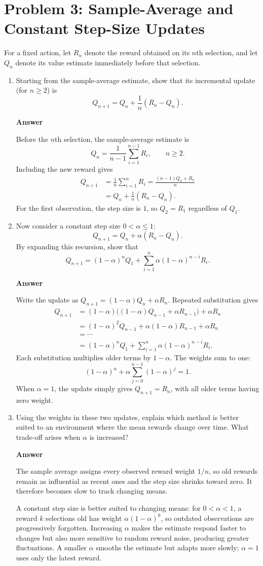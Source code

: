 \documentclass[11pt,a4paper]{article}
\newcommand{\answer}{\par\smallskip\textbf{Answer}\par}
\begin{document}
\newpage
\section{Problem 3: Sample-Average and Constant Step-Size Updates}
For a fixed action, let $R_n$ denote the reward obtained on its $n$th selection, and let $Q_n$ denote its value estimate immediately before that selection.
\begin{enumerate}
\item Starting from the sample-average estimate, show that its incremental update (for $n\geq2$) is
\[
Q_{n+1}=Q_n+\frac{1}{n}(R_n-Q_n).
\]
\answer
Before the $n$th selection, the sample-average estimate is
\[
Q_n=\frac{1}{n-1}\sum_{i=1}^{n-1}R_i,\qquad n\geq2.
\]
Including the new reward gives
\begin{align*}
Q_{n+1}
&=\frac{1}{n}\sum_{i=1}^{n}R_i
=\frac{(n-1)Q_n+R_n}{n}\\
&=Q_n+\frac{1}{n}(R_n-Q_n).
\end{align*}
For the first observation, the step size is $1$, so $Q_2=R_1$ regardless of $Q_1$.

\item Now consider a constant step size $0<\alpha\leq1$:
\[
Q_{n+1}=Q_n+\alpha(R_n-Q_n).
\]
By expanding this recursion, show that
\[
Q_{n+1}=(1-\alpha)^nQ_1+\sum_{i=1}^{n}\alpha(1-\alpha)^{n-i}R_i.
\]
\answer
Write the update as $Q_{n+1}=(1-\alpha)Q_n+\alpha R_n$. Repeated substitution gives
\begin{align*}
Q_{n+1}
&=(1-\alpha)\bigl((1-\alpha)Q_{n-1}+\alpha R_{n-1}\bigr)+\alpha R_n\\
&=(1-\alpha)^2Q_{n-1}+\alpha(1-\alpha)R_{n-1}+\alpha R_n\\
&=\cdots\\
&=(1-\alpha)^nQ_1+\sum_{i=1}^{n}\alpha(1-\alpha)^{n-i}R_i.
\end{align*}
Each substitution multiplies older terms by $1-\alpha$. The weights sum to one:
\[
(1-\alpha)^n+\alpha\sum_{j=0}^{n-1}(1-\alpha)^j=1.
\]
When $\alpha=1$, the update simply gives $Q_{n+1}=R_n$, with all older terms having zero weight.

\item Using the weights in these two updates, explain which method is better suited to an environment where the mean rewards change over time. What trade-off arises when $\alpha$ is increased?
\answer
The sample average assigns every observed reward weight $1/n$, so old rewards remain as influential as recent ones and the step size shrinks toward zero. It therefore becomes slow to track changing means.

A constant step size is better suited to changing means: for $0<\alpha<1$, a reward $k$ selections old has weight $\alpha(1-\alpha)^k$, so outdated observations are progressively forgotten. Increasing $\alpha$ makes the estimate respond faster to changes but also more sensitive to random reward noise, producing greater fluctuations. A smaller $\alpha$ smooths the estimate but adapts more slowly; $\alpha=1$ uses only the latest reward.
\end{enumerate}
\end{document}
